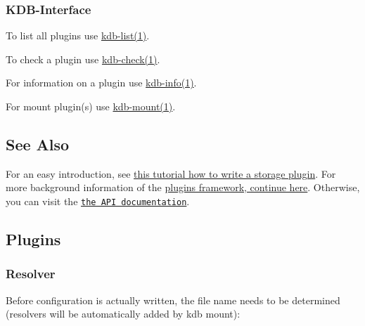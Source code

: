 \subsubsection*{K\+D\+B-\/\+Interface}


\begin{DoxyItemize}
\item To list all plugins use \hyperlink{doc_help_kdb-list_md}{kdb-\/list(1)}.
\item To check a plugin use \hyperlink{doc_help_kdb-check_md}{kdb-\/check(1)}.
\item For information on a plugin use \hyperlink{doc_help_kdb-info_md}{kdb-\/info(1)}.
\item For mount plugin(s) use \hyperlink{doc_help_kdb-mount_md}{kdb-\/mount(1)}.
\end{DoxyItemize}

\subsection*{See Also}

For an easy introduction, see \hyperlink{doc_tutorials_plugins_md}{this tutorial how to write a storage plugin}. For more background information of the \hyperlink{doc_dev_plugins-framework_md}{plugins framework, continue here}. Otherwise, you can visit the \href{https://doc.libelektra.org/api/current/html/group__plugin.html}{\tt the A\+PI documentation}.

\subsection*{Plugins}

\subsubsection*{Resolver}

Before configuration is actually written, the file name needs to be determined (resolvers will be automatically added by kdb mount)\+:


